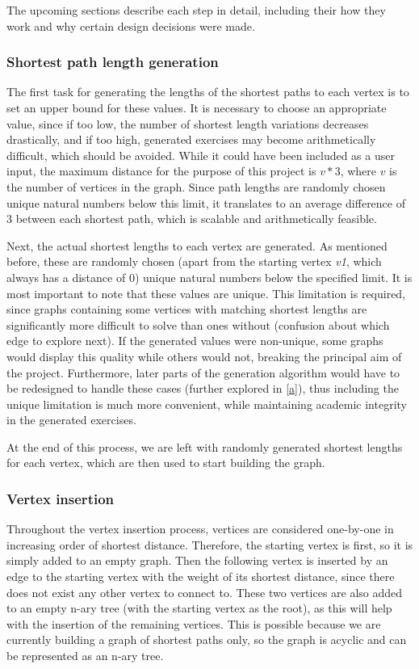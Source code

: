 \documentclass{l4proj}
\begin{document}
The upcoming sections describe each step in detail, including their how they work and why certain design decisions were made. 

\subsubsection{Shortest path length generation}
\label{sec:shortestpathdesign}
The first task for generating the lengths of the shortest paths to each vertex is to set an upper bound for these values. It is necessary to choose an appropriate value, since if too low, the number of shortest length variations decreases drastically, and if too high, generated exercises may become arithmetically difficult, which should be avoided. While it could have been included as a user input, the maximum distance for the purpose of this project is $v*3$, where $v$ is the number of vertices in the graph. Since path lengths are randomly chosen unique natural numbers below this limit, it translates to an average difference of $3$ between each shortest path, which is scalable and arithmetically feasible.

Next, the actual shortest lengths to each vertex are generated. As mentioned before, these are randomly chosen (apart from the starting vertex \emph{v1}, which always has a distance of $0$) unique natural numbers below the specified limit. It is most important to note that these values are unique. This limitation is required, since graphs containing some vertices with matching shortest lengths are significantly more difficult to solve than ones without (confusion about which edge to explore next). If the generated values were non-unique, some graphs would display this quality while others would not, breaking the principal aim of the project. Furthermore, later parts of the generation algorithm would have to be redesigned to handle these cases (further explored in \autoref{a}), thus including the unique limitation is much more convenient, while maintaining academic integrity in the generated exercises.

At the end of this process, we are left with randomly generated shortest lengths for each vertex, which are then used to start building the graph.

\subsubsection{Vertex insertion}
\label{sec:vi}

Throughout the vertex insertion process, vertices are considered one-by-one in increasing order of shortest distance. Therefore, the starting vertex is first, so it is simply added to an empty graph. Then the following vertex is inserted by an edge to the starting vertex with the weight of its shortest distance, since there does not exist any other vertex to connect to. These two vertices are also added to an empty n-ary tree (with the starting vertex as the root), as this will help with the insertion of the remaining vertices. This is possible because we are currently building a graph of shortest paths only, so the graph is acyclic and can be represented as an n-ary tree.
\end{document}
